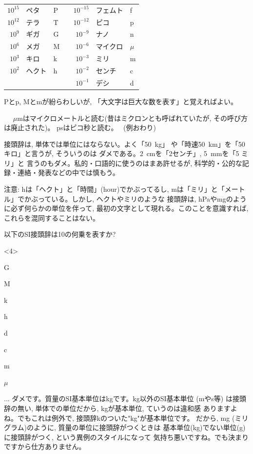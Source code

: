 \begin{tabular}{rlllrll}
$10^{15}$ & ペタ & P &  & $10^{-15}$ & フェムト & f\\
$10^{12}$ & テラ & T & & $10^{-12}$ & ピコ & p\\
$10^9$ & ギガ & G    & & $10^{-9}$ & ナノ & n\\
$10^6$ & メガ & M    & & $10^{-6}$ & マイクロ & $\mu$\\
$10^3$ & キロ & k    & & $10^{-3}$ & ミリ & m\\
$10^2$ & ヘクト & h  & & $10^{-2}$ & センチ & c\\
       &        &    & & $10^{-1}$ & デシ & d\\
\end{tabular}

Pとp, Mとmが紛らわしいが, 「大文字は巨大な数を表す」と覚えればよい。\\

\begin{exmpl}　
$\mu$mはマイクロメートルと読む(昔はミクロンとも呼ばれていたが, その呼び方は廃止された)。
psはピコ秒と読む。　
(例おわり)\end{exmpl}\mv

接頭辞は, 単体では単位にはならない。よく「50~kg」
や「時速50~km」を「50キロ」と言うが, そういうのは
ダメである。2~cmを「2センチ」, 5~mmを「5 ミリ」と
言うのもダメ。私的・口語的に使うのはまあ許せるが, 
科学的・公的な記録・連絡・発表などの中では慎もう。

{\small 注意: hは「ヘクト」と「時間」(hour)でかぶってるし, 
mは「ミリ」と「メートル」でかぶっている。しかし, ヘクトやミリのような
接頭辞は, hPaやmgのように必ず何らかの単位を伴って, 
最初の文字として現れる。このことを意識すれば, 
これらを混同することはない。}\mv

\begin{q}\label{q:SIsettouji} 以下のSI接頭辞は10の何乗を表すか?
\begin{edaenumerate}<4>
\item G
\item M
\item k
\item h
\item d
\item c
\item m
\item $\mu$
\end{edaenumerate}
\end{q}

\begin{faq}{\small{}
... ダメです。質量のSI基本単位はkgです。kg以外のSI基本単位 (mやs等)
は接頭辞の無い, 単体での単位だから, kgが基本単位, ていうのは違和感
ありますよね。でもこれは例外で, 接頭辞kのついた"kg"が基本単位です。
だから, mg (ミリグラム)のように, 質量の単位に接頭辞がつくときは
基本単位(kg)でない単位(g)に接頭辞がつく, という異例のスタイルになって
気持ち悪いですね。でも決まりですから仕方ありません。}
\end{faq}

